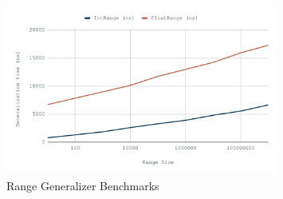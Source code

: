 \begin{figure}[H]
    \centering
    \includegraphics[width=0.8\textwidth]{images/range.png}
    \caption{Range Generalizer Benchmarks}\label{fig:range_bm}
\end{figure}